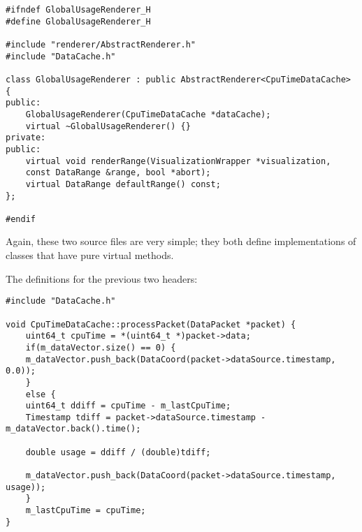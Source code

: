 \begin{lstlisting}
#ifndef GlobalUsageRenderer_H
#define GlobalUsageRenderer_H

#include "renderer/AbstractRenderer.h"
#include "DataCache.h"

class GlobalUsageRenderer : public AbstractRenderer<CpuTimeDataCache> {
public:
    GlobalUsageRenderer(CpuTimeDataCache *dataCache);
    virtual ~GlobalUsageRenderer() {}
private:
public:
    virtual void renderRange(VisualizationWrapper *visualization,
	const DataRange &range, bool *abort);
    virtual DataRange defaultRange() const;
};

#endif
\end{lstlisting}

Again, these two source files are very simple; they both define implementations of classes that have pure virtual
methods.

The definitions for the previous two headers:

\begin{lstlisting}
#include "DataCache.h"

void CpuTimeDataCache::processPacket(DataPacket *packet) {
    uint64_t cpuTime = *(uint64_t *)packet->data;
    if(m_dataVector.size() == 0) {
    m_dataVector.push_back(DataCoord(packet->dataSource.timestamp, 0.0));
    }
    else {
	uint64_t ddiff = cpuTime - m_lastCpuTime;
	Timestamp tdiff = packet->dataSource.timestamp - m_dataVector.back().time();
	
	double usage = ddiff / (double)tdiff;
	
	m_dataVector.push_back(DataCoord(packet->dataSource.timestamp, usage));
    }
    m_lastCpuTime = cpuTime;
}
\end{lstlisting}

